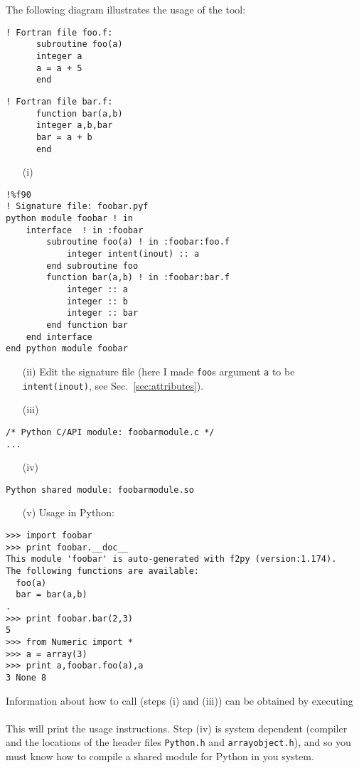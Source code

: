 The following diagram illustrates the usage of the tool:
\begin{verbatim}
! Fortran file foo.f:
      subroutine foo(a)
      integer a
      a = a + 5
      end
\end{verbatim}
\begin{verbatim}
! Fortran file bar.f:
      function bar(a,b)
      integer a,b,bar
      bar = a + b
      end
\end{verbatim}
\begin{itemize}
\item[(i)] 
\end{itemize}
\begin{verbatim}
!%f90
! Signature file: foobar.pyf
python module foobar ! in
    interface  ! in :foobar
        subroutine foo(a) ! in :foobar:foo.f
            integer intent(inout) :: a
        end subroutine foo
        function bar(a,b) ! in :foobar:bar.f
            integer :: a
            integer :: b
            integer :: bar
        end function bar
    end interface
end python module foobar
\end{verbatim}
\begin{itemize}
\item[(ii)] Edit the signature file (here I made \texttt{foo}s
  argument \texttt{a} to be \texttt{intent(inout)}, see
  Sec.~\ref{sec:attributes}).
\item[(iii)] 
\end{itemize}
\begin{verbatim}
/* Python C/API module: foobarmodule.c */
...
\end{verbatim}
\begin{itemize}
\item[(iv)] 
\end{itemize}
\begin{verbatim}
Python shared module: foobarmodule.so
\end{verbatim}
\begin{itemize}
\item[(v)] Usage in Python:
\end{itemize}
\vspace*{-4ex}
\begin{verbatim}
>>> import foobar
>>> print foobar.__doc__
This module 'foobar' is auto-generated with f2py (version:1.174).
The following functions are available:
  foo(a)
  bar = bar(a,b)
.
>>> print foobar.bar(2,3)
5
>>> from Numeric import *
>>> a = array(3)
>>> print a,foobar.foo(a),a
3 None 8
\end{verbatim}
Information about how to call \fpy (steps (i) and (iii)) can be
obtained by executing\\
\shell{\fpy}\\
This will print the usage instructions.
 Step (iv) is system dependent
(compiler and the locations of the header files \texttt{Python.h} and
\texttt{arrayobject.h}), and so you must know how to compile a shared
module for Python in you system.

